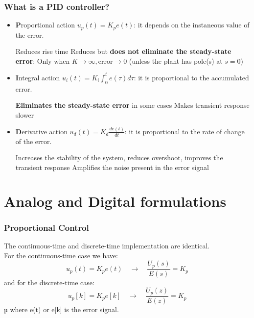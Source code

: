 \begin{frame}
	\frametitle{What is a PID controller?}
	\small{
	\begin{itemize}
		\item \textbf{P}roportional action $u_p(t) = K_p e(t)$: it depends on the instaneous value of the error. 
			\begin{itemize}
				\pro Reduces rise time
				\pro Reduces but \textbf{does not eliminate the steady-state error}: Only when $K \rightarrow \infty , \text{error} \rightarrow 0$
				 (unless the plant has pole(s) at $s=0$)
			\end{itemize}
		\item \textbf{I}ntegral action $u_i(t) =K_i\int_0^t e(\tau)d\tau$: it is proportional to the accumulated error.
			\begin{itemize}
				\pro  \textbf{Eliminates the steady-state error} in some cases
				\con Makes transient response slower 
			\end{itemize}
	
		\item \textbf{D}erivative action $u_d(t) = K_d \frac{de(t)}{dt}$: it is proportional to the rate of change of the error. 
			\begin{itemize}
				\pro Increases the stability of the system, reduces overshoot, improves the transient response
				\con Amplifies the noise present in the error signal
			\end{itemize}
	\end{itemize}}
\end{frame}

\section{Analog and Digital formulations}

\begin{frame}
	\frametitle{Proportional Control}
	The continuous-time and discrete-time implementation are identical.\\
	\vspace{1em}
	For the continuous-time case we have:
	\begin{equation*}
		u_p(t) = K_p e(t) \quad \rightarrow \quad \frac{U_p(s)}{E(s)} = K_p 
	\end{equation*}
	and for the discrete-time case:
	\begin{equation*}
		u_p[k] = K_p e[k] \quad \rightarrow \quad \frac{U_p(z)}{E(z)} = K_p 
	\end{equation*}µ
	where e(t) or e[k] is the error signal.
\end{frame}

